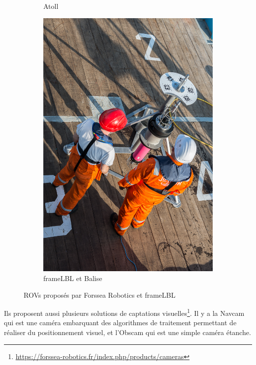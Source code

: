 \begin{figure}[!htb]
\begin{subfigure}[b]{0.3\textwidth}
            \caption{\gls{Atoll}}
        \end{subfigure}
        \hfill
        \begin{subfigure}[b]{0.3\textwidth}
            \centering
            \includegraphics[width=\textwidth]{imgs/Frame.jpg}
            \caption{\gls{frameLBL} et Balise}
        \end{subfigure}
        \caption{\gls{ROV}s proposés par Forssea Robotics et \gls{frameLBL}}
        \label{fig:ROVs}
    \end{figure}

    Ils proposent aussi plusieurs solutions de captations visuelles\footnote{\url{https://forssea-robotics.fr/index.php/products/cameras}}. Il y a la \gls{Navcam} qui est une caméra embarquant des algorithmes de traitement permettant de réaliser du positionnement visuel, et l'\gls{Obscam} qui est une simple caméra étanche.